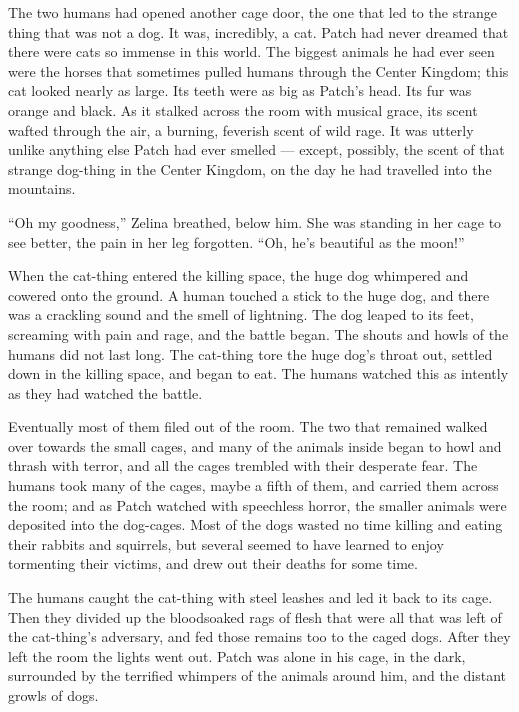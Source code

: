 \documentclass[12pt]{memoir}
\begin{document}
The two humans had opened another cage door, the one that led to the
strange thing that was not a dog. It was, incredibly, a cat. Patch had
never dreamed that there were cats so immense in this world. The
biggest animals he had ever seen were the horses that sometimes pulled
humans through the Center Kingdom; this cat looked nearly as
large. Its teeth were as big as Patch’s head. Its fur was orange and
black. As it stalked across the room with musical grace, its scent
wafted through the air, a burning, feverish scent of wild rage. It was
utterly unlike anything else Patch had ever smelled — except,
possibly, the scent of that strange dog-thing in the Center Kingdom,
on the day he had travelled into the mountains.

“Oh my goodness,” Zelina breathed, below him. She was standing in her
cage to see better, the pain in her leg forgotten. “Oh, he’s beautiful
as the moon!”

When the cat-thing entered the killing space, the huge dog whimpered
and cowered onto the ground. A human touched a stick to the huge dog,
and there was a crackling sound and the smell of lightning. The dog
leaped to its feet, screaming with pain and rage, and the battle
began. The shouts and howls of the humans did not last long. The
cat-thing tore the huge dog’s throat out, settled down in the killing
space, and began to eat. The humans watched this as intently as they
had watched the battle.

Eventually most of them filed out of the room. The two that remained
walked over towards the small cages, and many of the animals inside
began to howl and thrash with terror, and all the cages trembled with
their desperate fear. The humans took many of the cages, maybe a fifth
of them, and carried them across the room; and as Patch watched with
speechless horror, the smaller animals were deposited into the
dog-cages. Most of the dogs wasted no time killing and eating their
rabbits and squirrels, but several seemed to have learned to enjoy
tormenting their victims, and drew out their deaths for some time.

The humans caught the cat-thing with steel leashes and led it back to
its cage. Then they divided up the bloodsoaked rags of flesh that were
all that was left of the cat-thing’s adversary, and fed those remains
too to the caged dogs. After they left the room the lights went
out. Patch was alone in his cage, in the dark, surrounded by the
terrified whimpers of the animals around him, and the distant growls
of dogs.
\end{document}
